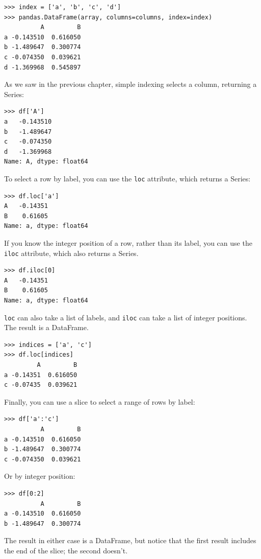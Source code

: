 \documentclass[12pt]{book}
\begin{document}
\begin{verbatim}
>>> index = ['a', 'b', 'c', 'd']
>>> pandas.DataFrame(array, columns=columns, index=index)
          A         B
a -0.143510  0.616050
b -1.489647  0.300774
c -0.074350  0.039621
d -1.369968  0.545897
\end{verbatim}

As we saw in the previous chapter, simple indexing selects a
column, returning a Series:

\begin{verbatim}
>>> df['A']
a   -0.143510
b   -1.489647
c   -0.074350
d   -1.369968
Name: A, dtype: float64
\end{verbatim}

To select a row by label, you can use the {\tt loc} attribute, which
returns a Series:

\begin{verbatim}
>>> df.loc['a']
A   -0.14351
B    0.61605
Name: a, dtype: float64
\end{verbatim}

If you know the integer position of a row, rather than its
label, you can use
the {\tt iloc} attribute, which also returns a Series.

\begin{verbatim}
>>> df.iloc[0]
A   -0.14351
B    0.61605
Name: a, dtype: float64
\end{verbatim}

{\tt loc} can also take a list of labels, and {\tt iloc} can take a list 
of integer positions.  The result is a DataFrame.

\begin{verbatim}
>>> indices = ['a', 'c']
>>> df.loc[indices]
         A         B
a -0.14351  0.616050
c -0.07435  0.039621
\end{verbatim}

Finally, you can use a slice to select a range of rows
by label:

\begin{verbatim}
>>> df['a':'c']
          A         B
a -0.143510  0.616050
b -1.489647  0.300774
c -0.074350  0.039621
\end{verbatim}

Or by integer position:

\begin{verbatim}
>>> df[0:2]
          A         B
a -0.143510  0.616050
b -1.489647  0.300774
\end{verbatim}

The result in either case is a DataFrame, but notice that the
first result includes the end of the slice; the second doesn't.
\end{document}
